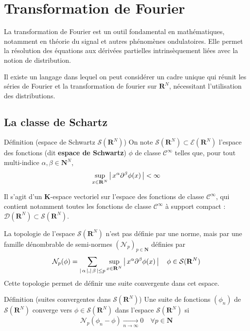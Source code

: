 \newpage

\section{Transformation de Fourier}

    La transformation de Fourier est un outil fondamental en mathématiques, notamment en théorie du signal et autres phénomènes ondulatoires. Elle permet la résolution des équations aux dérivées partielles intrinsèquement liées avec la notion de distribution.

    Il existe un langage dans lequel on peut considérer un cadre unique qui réunit les séries de Fourier et la transformation de fourier sur $\mathbf{R}^N$, nécessitant l’utilisation des distributions.

    \subsection{La classe de Schartz}

        \begin{omed}{Définition (espace de Schwartz $\mathcal{S}(\mathbf{R}^N)$)}
            On note $\mathcal{S}(\mathbf{R}^N) \subset \mathcal{E}(\mathbf{R}^N)$ l’espace des fonctions (dit \textbf{espace de Schwartz}) $\phi$ de classe $\mathcal{C}^{\infty}$ telles que, pour tout multi-indice $\alpha, \beta \in \mathbf{N}^N$, 
            \[ \sup_{x \in \mathbf{R}^N} \left\lvert \, x^{\alpha} \partial^{\beta} \phi(x) \, \right\rvert < \infty \]   
        \end{omed}

        Il s’agit d’un $\mathbf{K}$-espace vectoriel sur l’espace des fonctions de classe $\mathcal{C}^{\infty}$, qui contient notamment toutes les fonctions de classe $\mathcal{C}^{\infty}$ à support compact : $\mathcal{D}(\mathbf{R}^N) \subset \mathcal{S}(\mathbf{R}^N)$.

        La topologie de l’espace $\mathcal{S}(\mathbf{R}^N)$ n’est pas définie par une norme, mais par une famille dénombrable de semi-normes $(\mathcal{N}_p)_{p \in \mathbf{N}}$ définies par 
        \[ \mathcal{N}_p(\phi) = \sum_{\left\lvert \, \alpha \, \right\rvert, \left\lvert \, \beta \, \right\rvert \leq p} \sup_{x \in \mathbf{R}^N} \left\lvert \, x^{\alpha} \partial^{\beta} \phi(x) \, \right\rvert \quad \phi \in \mathcal{S}(\mathbf{R}^N) \]   
        Cette topologie permet de définir une suite convergente dans cet espace. 

        \begin{omed}{Définition (suites convergentes dans $\mathcal{S}(\mathbf{R}^N)$)}
            Une suite de fonctions $(\phi_n)$ de $\mathcal{S}(\mathbf{R}^N)$ converge vers $\phi \in \mathcal{S}(\mathbf{R}^N)$ dans l’espace $\mathcal{S}(\mathbf{R}^N)$ si 
            \[ \mathcal{N}_p(\phi_n - \phi) \underset{n \to \infty}{\longrightarrow} 0 \quad \forall p \in \mathbf{N} \]  
        \end{omed}

